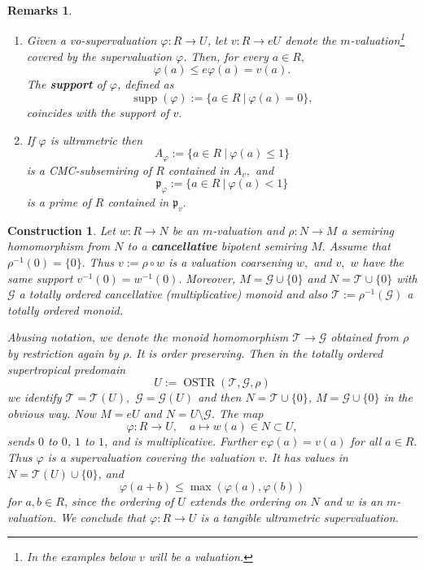 \documentclass [12pt,a4paper,reqno]{amsart}
\newtheorem{remarks}[thm]{Remarks}
\newtheorem{construction}[thm]{Construction}
\begin{document}
\begin{remarks}\label{remarks3.8}$ $
\begin{enumerate}
\item[a)] Given a vo-supervaluation $\varphi: R\to U$, let $v:
R\to eU$ denote the $m$-valuation\footnote{In the examples below
$v$ will be a valuation.} covered by the supervaluation $\varphi$.
Then, for every $a\in R,$
$$\varphi(a)\le e\varphi(a)=v(a).$$
The {\textbf{{support}}} of $\varphi$, defined as
$${\operatorname{supp}}(\varphi):=\{a\in R{\ {|} \ }\varphi(a)=0\},$$
coincides with the support of $v.$ \item[b)] If $\varphi$ is
ultrametric then
$$A_\varphi:=\{a\in R {\ {|} \ }\varphi(a)\le 1\}$$
is a CMC-subsemiring of $R$ contained in $A_v,$ and
$${\mathfrak p}_\varphi:=\{a\in R{\ {|} \ }\varphi(a)<1\}$$
is a prime of $R$ contained in ${\mathfrak p}_v.$
\end{enumerate}
\end{remarks}

\begin{construction}\label{constr3.9}
Let $w:R\to N$ be an $m$-valuation and $\rho: N\to M$ a semiring
homomorphism from $N$ to a {\textbf{{cancellative}}} bipotent semiring
$M.$ Assume that $\rho^{-1}(0)=\{0\}.$ Thus $v:= \rho \circ w$ is
a valuation coarsening $w,$ and $v,$ $w$ have the same support
$v^{-1}(0)=w^{-1}(0).$ Moreover, $M={\mathcal G}  \cup\{0\}$ and $N
={\mathcal T}\cup\{0\}$ with ${\mathcal G} $ a totally ordered cancellative
(multiplicative) monoid and also ${\mathcal T}:=\rho^{-1}({\mathcal G} )$ a totally
ordered monoid.

Abusing notation, we denote the monoid homomorphism ${\mathcal T}\to {\mathcal G} $
obtained from $\rho$ by restriction again by $\rho.$ It is order
preserving. Then in  the totally ordered supertropical predomain
$$U:={\operatorname{OSTR}}({\mathcal T},{\mathcal G} ,\rho)$$
we identify ${\mathcal T}={\mathcal T}(U),$ ${\mathcal G} ={\mathcal G} (U)$ and then
$N={\mathcal T}\cup\{0\}$, $M={\mathcal G} \cup\{0\}$ in the obvious way. Now $M=eU$
and $N = U\setminus{\mathcal G} $. The map
$$\varphi: R\to U,\quad a\mapsto w(a)\in N\subset U,$$ sends $0$ to
$0$, $1$ to $1$, and is multiplicative. Further $e\varphi(a)=v(a)$
for all $a\in R.$ Thus $\varphi$ is a supervaluation covering the
valuation $v.$ It has values in $N={\mathcal T}(U)\cup\{0\}$, and
$$\varphi(a+b)\le\max(\varphi(a),\varphi(b))$$
for $a,b\in R$, since the ordering of $U$ extends the ordering on
$N$ and $w$ is an $m$-valuation. We conclude that $\varphi: R\to
U$ is a tangible ultrametric supervaluation.
\end{construction}
\end{document}
